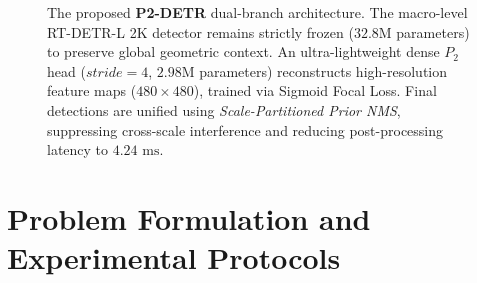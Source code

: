 \documentclass[runningheads]{llncs}
\begin{document}
\begin{figure}[!t]
{
}
\caption{The proposed \textbf{P2-DETR} dual-branch architecture. The macro-level RT-DETR-L 2K detector remains strictly frozen ($32.8\text{M}$ parameters) to preserve global geometric context. An ultra-lightweight dense $P_2$ head ($stride=4$, $2.98\text{M}$ parameters) reconstructs high-resolution feature maps ($480 \times 480$), trained via Sigmoid Focal Loss. Final detections are unified using \textit{Scale-Partitioned Prior NMS}, suppressing cross-scale interference and reducing post-processing latency to $4.24\text{ ms}$.}
\label{fig:architecture_pipeline}
\end{figure}

\section{Problem Formulation and Experimental Protocols}
\end{document}
